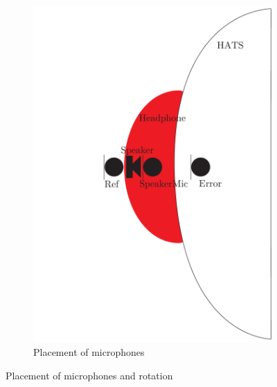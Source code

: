 \begin{figure}[H]
\begin{subfigure}[b]{.4\textwidth}
	\includegraphics[width=\textwidth]{../Journal/Experiments/AngleOfIncidence/AngleOfIncidenceSchematic.pdf}
	\caption{Placement of microphones}
	\label{fig:AngOgIndMicplace}
\end{subfigure}
	\caption{Placement of microphones and rotation}
	\label{fig:AngleOfIndDiagram}
\end{figure}


